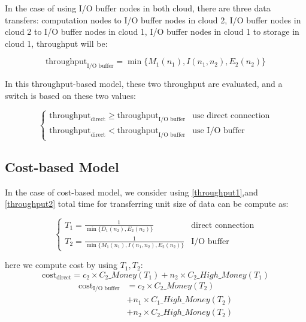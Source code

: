 \documentclass[JIP,draft]{ipsj}
\begin{document}
In the case of using I/O buffer nodes in both cloud, there are three data transfers: computation nodes to I/O buffer nodes in cloud 2, I/O buffer nodes in cloud 2 to I/O buffer nodes in cloud 1, I/O buffer nodes in cloud 1 to storage in cloud 1, throughput will be:

\begin{equation}
	\text{throughput}_{\text{I/O buffer}}=\min\{M_1(n_1),I(n_1,n_2),E_2(n_2)\} \label{throughput2}
\end{equation}

In this throughput-based model, these two throughput are evaluated, and a switch is based on these two values:

\begin{equation}
	\begin{cases}
		\text{throughput}_{\text{direct}} \geq \text{throughput}_{\text{I/O buffer}} & \text{use direct connection}\\
		\text{throughput}_{\text{direct}} < \text{throughput}_{\text{I/O buffer}} & \text{use I/O buffer}
	\end{cases}
\end{equation}

\subsection{Cost-based Model}
In the case of cost-based model, we consider
using \ref{throughput1},and \ref{throughput2} total time for transferring unit size of data can be compute as:

\begin{equation}
	\begin{cases}
		T_1=\frac{1}{\min\{D_1(n_2),E_2(n_2)\}} & \text{direct connection}\\
		T_2=\frac{1}{\min\{M_1(n_1),I(n_1,n_2),E_2(n_2)\}} &\text{I/O buffer}
	\end{cases}
\end{equation}

here we compute cost by using $T_1,T_2$:
\begin{equation}
	\text{cost}_\text{direct}=c_2\times C_2\_Money(T_1)+n_2\times C_2\_High\_Money(T_1)
\end{equation}
\begin{align}
	\text{cost}_\text{I/O buffer}&=c_2\times C_2\_Money(T_2)\\\nonumber 
				     &+n_1\times C_1\_High\_Money(T_2)\\ \nonumber
				     &+n_2\times C_2\_High\_Money(T_2)
\end{align}
\end{document}

